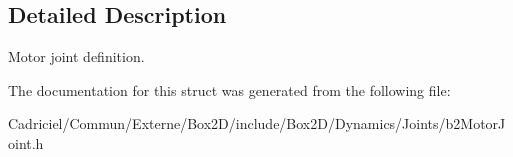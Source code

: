 \subsection{Detailed Description}
Motor joint definition. 

The documentation for this struct was generated from the following file\+:\begin{DoxyCompactItemize}
\item 
Cadriciel/\+Commun/\+Externe/\+Box2\+D/include/\+Box2\+D/\+Dynamics/\+Joints/b2\+Motor\+Joint.\+h\end{DoxyCompactItemize}
